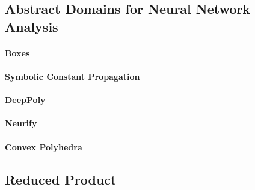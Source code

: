 \subsection{Abstract Domains for Neural Network Analysis}

\paragraph{Boxes}

\paragraph{Symbolic Constant Propagation}

\paragraph{DeepPoly}

\paragraph{Neurify}

\paragraph{Convex Polyhedra}

\subsection{Reduced Product}
